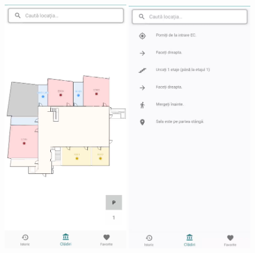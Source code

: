    \begin{figure}[!h]
        \centering
        \begin{minipage}[b]{0.49\textwidth}
            \captionsetup{justification=centering}
             \includegraphics[width=0.49\textwidth]{figures/upb_apps/navigation/upb_campus_unpublished1.png}
             \includegraphics[width=0.49\textwidth]{figures/upb_apps/navigation/upb_campus_unpublished2.png}

\end{minipage}
\end{figure}

